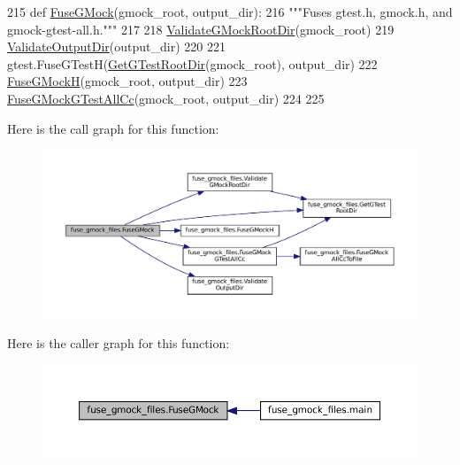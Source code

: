 \begin{DoxyCode}
215 \textcolor{keyword}{def }\hyperlink{namespacefuse__gmock__files_ae76b6bc18373325fc3f002abf5c4378f}{FuseGMock}(gmock\_root, output\_dir):
216   \textcolor{stringliteral}{"""Fuses gtest.h, gmock.h, and gmock-gtest-all.h."""}
217 
218   \hyperlink{namespacefuse__gmock__files_aaec09f55a62b3d65b5d25fe0050e9e05}{ValidateGMockRootDir}(gmock\_root)
219   \hyperlink{namespacefuse__gmock__files_a68581e210793099d656537faa719df29}{ValidateOutputDir}(output\_dir)
220 
221   gtest.FuseGTestH(\hyperlink{namespacefuse__gmock__files_aae591d77d2d969394996f9fc2017824c}{GetGTestRootDir}(gmock\_root), output\_dir)
222   \hyperlink{namespacefuse__gmock__files_abab451606f671f59404f23276aad2c34}{FuseGMockH}(gmock\_root, output\_dir)
223   \hyperlink{namespacefuse__gmock__files_a50eb499fcb075e19191e8403bd85c813}{FuseGMockGTestAllCc}(gmock\_root, output\_dir)
224 
225 
\end{DoxyCode}
Here is the call graph for this function\+:
\nopagebreak
\begin{figure}[H]
\begin{center}
\leavevmode
\includegraphics[width=350pt]{namespacefuse__gmock__files_ae76b6bc18373325fc3f002abf5c4378f_cgraph}
\end{center}
\end{figure}
Here is the caller graph for this function\+:
\nopagebreak
\begin{figure}[H]
\begin{center}
\leavevmode
\includegraphics[width=350pt]{namespacefuse__gmock__files_ae76b6bc18373325fc3f002abf5c4378f_icgraph}
\end{center}
\end{figure}
\mbox{\label{namespacefuse__gmock__files_af470a39a4df492b1ca0d9493eac8222b}} 
